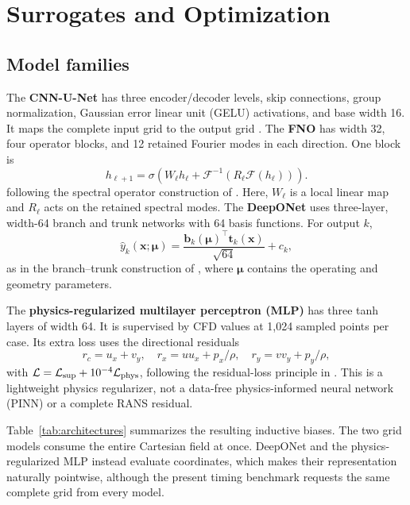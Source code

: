\documentclass[conference]{IEEEtran}
\begin{document}
\section{Surrogates and Optimization}
\subsection{Model families}
The \textbf{CNN-U-Net} has three encoder/decoder levels, skip connections,
group normalization, Gaussian error linear unit (GELU) activations, and base
width 16. It maps the complete
input grid to the output grid \cite{ronneberger2015unet}. The \textbf{FNO} has width 32, four operator
blocks, and 12 retained Fourier modes in each direction. One block is
\begin{equation}
h_{\ell+1}=\sigma\!\left(W_\ell h_\ell+
\mathcal{F}^{-1}\!\left(R_\ell\mathcal{F}(h_\ell)\right)\right).
\end{equation}
following the spectral operator construction of \cite{li2021fno}.
Here, $W_\ell$ is a local linear map and $R_\ell$ acts on the retained spectral
modes. The \textbf{DeepONet} uses three-layer, width-64 branch and trunk
networks with 64 basis functions. For output $k$,
\begin{equation}
\widehat{y}_k(\mathbf{x};\boldsymbol{\mu})=
\frac{\mathbf{b}_k(\boldsymbol{\mu})^\top\mathbf{t}_k(\mathbf{x})}{\sqrt{64}}+c_k,
\end{equation}
as in the branch--trunk construction of \cite{lu2021deeponet},
where $\boldsymbol{\mu}$ contains the operating and geometry parameters.

The \textbf{physics-regularized multilayer perceptron (MLP)} has three tanh
layers of width 64. It is
supervised by CFD values at 1,024 sampled points per case. Its extra loss uses
the directional residuals
\begin{equation}
r_c=u_x+v_y,\quad r_x=u u_x+p_x/\rho,\quad r_y=v v_y+p_y/\rho,
\end{equation}
with $\mathcal{L}=\mathcal{L}_{\rm sup}+10^{-4}\mathcal{L}_{\rm phys}$,
following the residual-loss principle in \cite{raissi2019pinn}.
This is a lightweight physics regularizer, not a data-free physics-informed
neural network (PINN) or a complete RANS residual.

Table~\ref{tab:architectures} summarizes the resulting inductive biases. The
two grid models consume the entire Cartesian field at once. DeepONet and the
physics-regularized MLP instead evaluate coordinates, which makes their
representation naturally pointwise, although the present timing benchmark
requests the same complete grid from every model.
\end{document}
